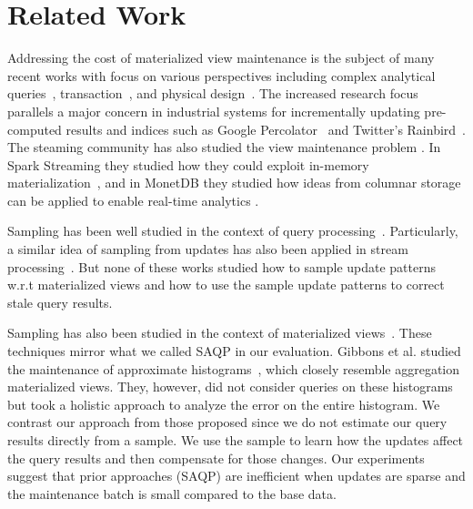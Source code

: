 \section{Related Work}\label{related}

Addressing the cost of materialized view maintenance is the subject of many recent works with
focus on various perspectives including complex analytical queries~\cite{nikolic2014linview}, transaction~\cite{bailis2014scalable}, and physical design~\cite{lefevre2014opportunistic}.
The increased research focus parallels a major concern in industrial systems for incrementally updating pre-computed results and indices such as Google Percolator~\cite{percolator} and Twitter's Rainbird~\cite{rainbird}.
The steaming community has also studied the view maintenance problem \cite{abadi2003aurora,golab2011consistency, golab2012scalable, he2010comet, ghanem2010supporting}. In Spark Streaming they studied how they could exploit in-memory materialization~\cite{zaharia2012discretized}, and in MonetDB they studied how ideas from columnar storage can be applied to enable real-time analytics \cite{liarou2012monetdb}.


Sampling has been well studied in the context of query processing~\cite{agarwal2013blinkdb, olken1993random, garofalakis2001approximate}. Particularly, a similar idea of sampling from updates has also been applied in stream processing~\cite{tatbul2003load, Garofalakis, rabkin2014aggregation}. But none of these works studied how to sample update patterns w.r.t materialized views and how to use the sample update patterns to correct stale query results.

Sampling has also been studied in the context of materialized views~\cite{joshi2008materialized,DBLP:conf/icde/OlkenR92}.
These techniques mirror what we called SAQP in our evaluation.
Gibbons et al. studied the maintenance of approximate histograms~\cite{gibbons1997fast}, which closely resemble aggregation materialized views.
They, however, did not consider queries on these histograms but took a holistic approach to analyze the error on the entire histogram.
We contrast our approach from those proposed since we do not estimate our query results directly from a sample.
We use the sample to learn how the updates affect the query results and then compensate for those changes.
Our experiments suggest that prior approaches (SAQP) are inefficient when updates are sparse and the maintenance batch is small compared to the base data.

